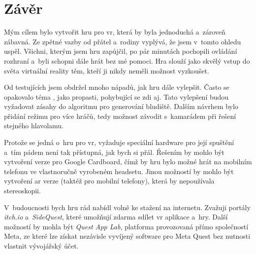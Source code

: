 \chapter*{Závěr}

Mým cílem bylo vytvořit hru pro \gls{vr}, která by byla jednoduchá a~zároveň zábavná. Ze zpětné vazby od přátel a~rodiny vyplývá, že jsem v~tomto ohledu uspěl. Všichni, kterým jsem hru zapůjčil, po pár minutách pochopili ovládání rozhraní a~byli schopni dále hrát bez mé pomoci. Hra slouží jako skvělý vstup do světa virtuální reality těm, kteří ji nikdy neměli možnost vyzkoušet.

Od testujících jsem obdržel mnoho nápadů, jak hru dále vylepšit. Často se opakovalo téma , jako propasti, pohybující se zdi aj. Tato vylepšení budou vyžadovat zásahy do algoritmu pro generování bludiště. Dalším návrhem bylo přidání režimu pro více hráčů, tedy možnost závodit s~kamarádem při řešení stejného hlavolamu.

Protože se jedná o~hru pro \gls{vr}, vyžaduje speciální hardware pro její spuštění a~tím pádem není tak přístupná, jak bych si přál. Řešením by mohlo být vytvoření verze pro Google Cardboard, čímž by hru bylo možné hrát na mobilním telefonu ve vlastnoručně vyrobeném headsetu. Jinou možností by mohlo být vytvoření \gls{ar} verze (taktéž pro mobilní telefony), která by nepoužívala stereoskopii.

V~budoucnosti bych hru rád nabídl volně ke stažení na internetu. Zvažuji portály \textit{itch.io} a~\textit{SideQuest}, které umožňují zdarma sdílet \gls{vr} aplikace a~hry. Další možností by mohla být \textit{Quest App Lab}, platforma provozovaná přímo společností Meta, ze které lze získat nezávisle vyvíjený software pro Meta Quest bez nutnosti vlastnit vývojářský účet.